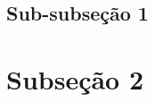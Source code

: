 \subsection[Sub-subseção 1]{Sub-subseção 1}\label{subsec:conclusao-subsubsecao1}
    \lipsum[1]



\section[Subseção 2]{Subseção 2}\label{sec:conclusao-subsecao2}
    \lipsum[1]
